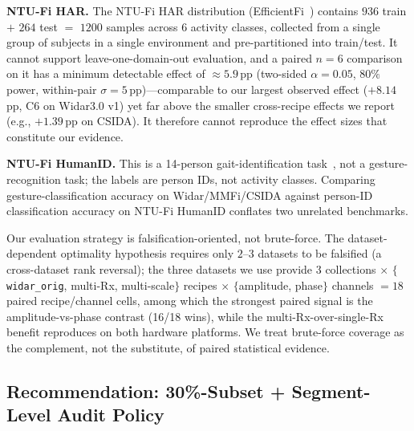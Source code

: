 \documentclass[11pt]{article}
\theoremstyle{definition}
\begin{document}
\textbf{NTU-Fi HAR.} The NTU-Fi HAR distribution (EfficientFi~\cite{yang2022efficientfi}) contains $936$ train $+$ $264$ test $=$ $1200$ samples across $6$ activity classes, collected from a single group of subjects in a single environment and pre-partitioned into train/test. It cannot support leave-one-domain-out evaluation, and a paired $n{=}6$ comparison on it has a minimum detectable effect of $\approx$$5.9$\,pp (two-sided $\alpha{=}0.05$, $80\%$ power, within-pair $\sigma{=}5$\,pp)---comparable to our largest observed effect ($+8.14$\,pp, C6 on Widar3.0 v1) yet far above the smaller cross-recipe effects we report (e.g., $+1.39$\,pp on CSIDA). It therefore cannot reproduce the effect sizes that constitute our evidence.

\textbf{NTU-Fi HumanID.} This is a 14-person gait-identification task~\cite{wang2022caution}, not a gesture-recognition task; the labels are person IDs, not activity classes. Comparing gesture-classification accuracy on Widar/MMFi/CSIDA against person-ID classification accuracy on NTU-Fi HumanID conflates two unrelated benchmarks.

Our evaluation strategy is falsification-oriented, not brute-force. The dataset-dependent optimality hypothesis requires only $2$--$3$ datasets to be falsified (a cross-dataset rank reversal); the three datasets we use provide $3$ collections $\times$ $\{$\texttt{widar\_orig}, multi-Rx, multi-scale$\}$ recipes $\times$ $\{$amplitude, phase$\}$ channels $= 18$ paired recipe/channel cells, among which the strongest paired signal is the amplitude-vs-phase contrast (16/18 wins), while the multi-Rx-over-single-Rx benefit reproduces on both hardware platforms. We treat brute-force coverage as the complement, not the substitute, of paired statistical evidence.

\subsection{Recommendation: 30\%-Subset + Segment-Level Audit Policy}
\end{document}
